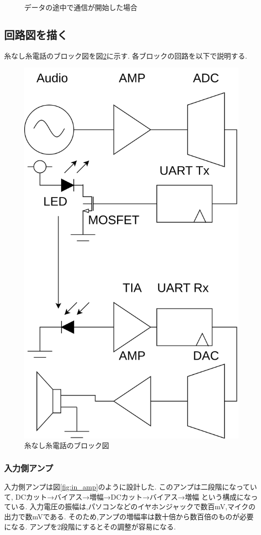 \documentclass[a4paper,10pt]{article}
\begin{document}
\begin{multicols}{2}
\begin{figure}[H]
    \caption{データの途中で通信が開始した場合} 
    \label{fig:saikai_protocol}
\end{figure}

\subsection{回路図を描く}
糸なし糸電話のブロック図を図\ref{fig:block_diagram}に示す.
各ブロックの回路を以下で説明する.

\begin{figure}[H]
    \centering
    \includegraphics[width=0.8\linewidth]{figure/block_diagram.png} 
    \caption{糸なし糸電話のブロック図} 
    \label{fig:block_diagram}
\end{figure}

\subsubsection{入力側アンプ}
入力側アンプは図\ref{fig:in_amp}のように設計した.
このアンプは二段階になっていて,
  DCカット→バイアス→増幅→DCカット→バイアス→増幅
という構成になっている.
入力電圧の振幅は,パソコンなどのイヤホンジャックで数百mV,マイクの出力で数mVである.
そのため,アンプの増幅率は数十倍から数百倍のものが必要になる.
アンプを2段階にするとその調整が容易になる.


\end{multicols}
\end{document}
